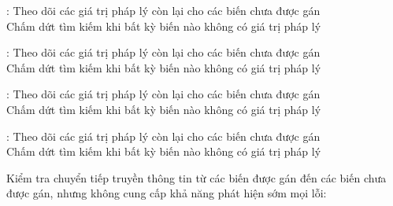 \documentclass{article}
\begin{document}
\begin{huge}

: Theo dõi các giá trị pháp lý còn lại cho các biến chưa được gán\\
Chấm dứt tìm kiếm khi bất kỳ biến nào không có giá trị pháp lý

\vspace*{0.1in}

\maxfigwidth
{}



: Theo dõi các giá trị pháp lý còn lại cho các biến chưa được gán\\
Chấm dứt tìm kiếm khi bất kỳ biến nào không có giá trị pháp lý

\vspace*{0.1in}

\maxfigwidth
{}



: Theo dõi các giá trị pháp lý còn lại cho các biến chưa được gán\\
Chấm dứt tìm kiếm khi bất kỳ biến nào không có giá trị pháp lý

\vspace*{0.1in}

\maxfigwidth
{}



: Theo dõi các giá trị pháp lý còn lại cho các biến chưa được gán\\
Chấm dứt tìm kiếm khi bất kỳ biến nào không có giá trị pháp lý

\vspace*{0.1in}

\maxfigwidth
{}


Kiểm tra chuyển tiếp truyền thông tin từ các biến được gán đến các biến chưa được gán,
nhưng không cung cấp khả năng phát hiện sớm mọi lỗi:


\end{huge}
\end{document}
